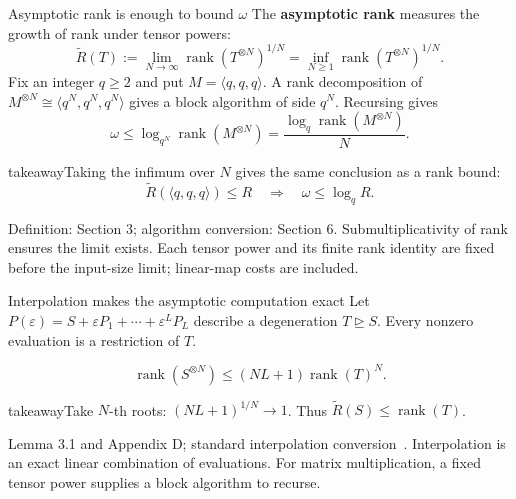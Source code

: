 \documentclass[aspectratio=169,11pt]{beamer}
\newcommand{\rank}{\operatorname{rank}}
\newcommand{\degen}{\unrhd}
\newcommand{\cmm}[3]{\langle #1,#2,#3\rangle}
\newcommand{\source}[1]{\vfill\par{\fontsize{7.5}{9}\selectfont\color{muted}#1\par}}
\newcommand{\takeaway}[1]{\begin{beamercolorbox}[sep=0.65em,wd=\linewidth]{takeaway}#1\end{beamercolorbox}}
\begin{document}
\begin{frame}{Asymptotic rank is enough to bound $\omega$}
  The \textbf{asymptotic rank} measures the growth of rank under tensor powers:
  \[
    \widetilde R(T):=\lim_{N\to\infty}\rank(T^{\otimes N})^{1/N}
      =\inf_{N\ge1}\rank(T^{\otimes N})^{1/N}.
  \]
  Fix an integer $q\ge2$ and put $M=\cmm{q}{q}{q}$.
  A rank decomposition of
  $M^{\otimes N}\cong\cmm{q^N}{q^N}{q^N}$ gives a block algorithm
  of side $q^N$. Recursing gives
  \[
    \omega\le\log_{q^N}\rank(M^{\otimes N})
      =\frac{\log_q\rank(M^{\otimes N})}{N}.
  \]
  \takeaway{Taking the infimum over $N$ gives the same conclusion as a rank bound:
    \[
      \widetilde R(\cmm{q}{q}{q})\le R
        \quad\Longrightarrow\quad\omega\le\log_q R.
    \]}
  \source{Definition: Section 3; algorithm conversion: Section 6.
  Submultiplicativity of rank ensures the limit exists. Each tensor power and
  its finite rank identity are fixed before the input-size limit;
  linear-map costs are included.}
\end{frame}

\begin{frame}{Interpolation makes the asymptotic computation exact}
  Let $P(\varepsilon)=S+\varepsilon P_1+\cdots+\varepsilon^L P_L$ describe
  a degeneration $T\degen S$. Every nonzero evaluation is a restriction of $T$.
  \medskip
  \begin{center}
  \end{center}
  \[
    \rank(S^{\otimes N})\le(NL+1)\rank(T)^N.
  \]
  \takeaway{Take $N$-th roots: $(NL+1)^{1/N}\to1$. Thus
    $\displaystyle\widetilde R(S)\le\rank(T)$.}
  \source{Lemma 3.1 and Appendix D; standard interpolation conversion~\cite{interpolation}.
  Interpolation is an exact linear combination of evaluations. For matrix
  multiplication, a fixed tensor power supplies a block algorithm to recurse.}
\end{frame}
\end{document}
